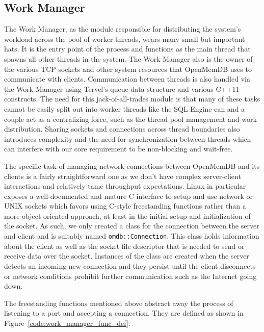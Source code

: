 \documentclass[letterpaper, 12pt]{article}
\begin{document}
  \subsection{Work Manager}
  The Work Manager, as the module responsible for distributing the system's workload across the
  pool of worker threads, wears many small but important hats. It is the entry point of the
  process and functions as the main thread that spawns all other threads in the system. The Work
  Manager also is the owner of the various TCP sockets and other system resources that OpenMemDB
  uses to communicate with clients. Communication between threads is also handled via the
  Work Manager using Tervel's queue data structure and various C++11 constructs. The need for this
  jack-of-all-trades module is that many of these tasks cannot be easily split out into
  worker threads like the SQL Engine can and a couple act as a centralizing force, such as the
  thread pool management and work distribution. Sharing sockets and connections across thread
  boundaries also introduces complexity and the need for synchronization between threads which
  can interfere with our core requirement to be non-blocking and wait-free.
  \par\vspace{\baselineskip}
  The specific task of managing network connections between OpenMemDB and its clients is a fairly
  straightforward one as we don't have complex server-client interactions and relatively tame
  throughput expectations. Linux in particular exposes a well-documented and mature C interface
  to setup and use network or UNIX sockets which favors using C-style freestanding functions
  rather than a more object-oriented approach, at least in the initial setup and initialization
  of the socket. As such, we only created a class for the connection between the server and client
  and is suitably named \lstinline[basicstyle=\ttfamily]|omdb::Connection|. This class holds
  information about the client as well as the socket file descriptor that is needed to send
  or receive data over the socket. Instances of the class are created when the server detects an
  incoming new connection and they persist until the client disconnects or network conditions
  prohibit further communication such as the Internet going down.
  \par\vspace{\baselineskip}
  The freestanding functions mentioned above abstract away the process of listening to a port
  and accepting a connection. They are defined as shown in Figure~\ref{code:work_manager_func_def}.
\end{document}
